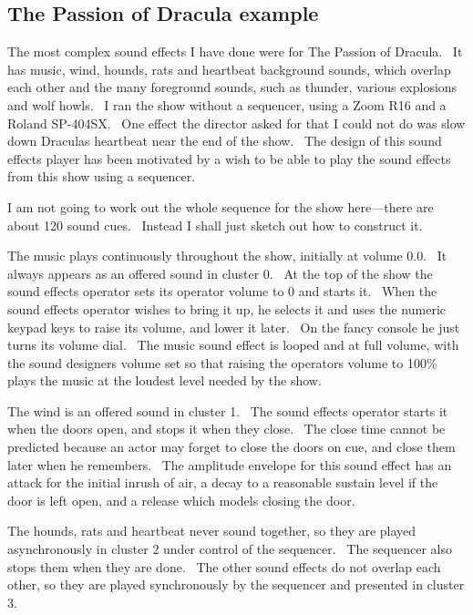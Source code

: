 \documentclass[letterpaper]{article}
\begin{document}
\subsection{The Passion of Dracula example}
The most complex sound effects I have done were for The Passion of
Dracula. \ It has music, wind, hounds, rats and heartbeat background
sounds, which overlap each other and the many foreground sounds, such
as thunder, various explosions and wolf howls. \ I ran the show without
a sequencer, using a Zoom R16 and a Roland SP-404SX. \ One effect the
director asked for that I could not do was slow down
Dracula{\textquotesingle}s heartbeat near the end of the show. \ The
design of this sound effects player has been motivated by a wish to be
able to play the sound effects from this show using a sequencer.

I am not going to work out the whole sequence for the show here—there
are about 120 sound cues. \ Instead I shall just sketch out how to
construct it.

The music plays continuously throughout the show, initially at volume
0.0. \ It always appears as an offered sound in cluster 0. \ At the top
of the show the sound effects operator sets its operator volume to 0
and starts it. \ When the sound effects operator wishes to bring it up,
he selects it and uses the numeric keypad keys to raise its volume, and
lower it later. \ On the fancy console he just turns its volume dial.
\ The music sound effect is looped and at full volume, with the sound
designer{\textquotesingle}s volume set so that raising the
operator{\textquotesingle}s volume to 100\% plays the music at the
loudest level needed by the show.

The wind is an offered sound in cluster 1. \ The sound effects operator
starts it when the doors open, and stops it when they close. \ The
close time cannot be predicted because an actor may forget to close the
doors on cue, and close them later when he remembers. \ The amplitude
envelope for this sound effect has an attack for the initial inrush of
air, a decay to a reasonable sustain level if the door is left open,
and a release which models closing the door.

The hounds, rats and heartbeat never sound together, so they are played
asynchronously in cluster 2 under control of the sequencer. \ The
sequencer also stops them when they are done. \ The other sound effects
do not overlap each other, so they are played synchronously by the
sequencer and presented in cluster 3.
\end{document}
